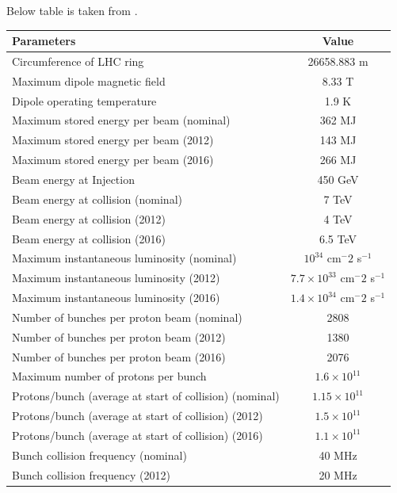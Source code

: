 Below table is taken from \cite{Schoerner-Sadenius2015, LHC-parameters-2016, LHC-tdr-vol1}.


\begin{table}
\centering
\begin{tabular}[!ht]{l c}
\hline
{\bf Parameters} & {\bf Value} \\
\hline
Circumference of LHC ring   &   26658.883 m \\
\hline
Maximum dipole magnetic field   & 8.33 T \\
Dipole operating temperature    & 1.9 K \\
\hline
Maximum stored energy per beam (nominal) &   362 MJ \\
Maximum stored energy per beam  (2012) &   143 MJ \\
Maximum stored energy per beam  (2016) &   266 MJ \\
\hline
Beam energy at Injection    & 450 GeV \\
Beam energy at collision (nominal) &    7 TeV \\
Beam energy at collision (2012)     &   4 TeV \\
Beam energy at collision (2016)     &   6.5 TeV \\
\hline
Maximum instantaneous luminosity (nominal)  &   $10^{34}$ cm$^-2$ s$^{-1}$ \\
Maximum instantaneous luminosity (2012)     &   $7.7 \times 10^{33}$ cm$^-2$ s$^{-1}$ \\
Maximum instantaneous luminosity (2016)     &   $1.4 \times 10^{34}$ cm$^-2$ s$^{-1}$ \\
\hline
Number of bunches per proton beam (nominal) &   2808 \\
Number of bunches per proton beam (2012)    &   1380 \\
Number of bunches per proton beam (2016)    &   2076 \\
Maximum number of protons per bunch         &   $1.6 \times 10^{11}$ \\
\hline
Protons/bunch (average at start of collision) (nominal)   &   $1.15 \times 10^{11}$ \\
Protons/bunch (average at start of collision) (2012)  &   $1.5 \times 10^{11}$ \\
Protons/bunch (average at start of collision) (2016)  &   $1.1 \times 10^{11}$ \\
\hline
Bunch collision frequency (nominal)         &   40 MHz  \\
Bunch collision frequency (2012)            &   20 MHz  \\

\end{tabular}
\end{table}
